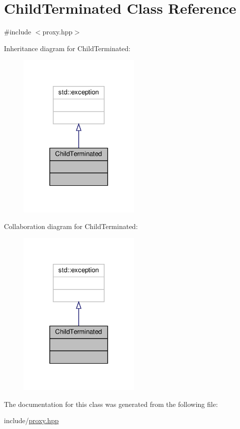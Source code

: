\hypertarget{classChildTerminated}{}\section{Child\+Terminated Class Reference}
\label{classChildTerminated}


{\ttfamily \#include $<$proxy.\+hpp$>$}



Inheritance diagram for Child\+Terminated\+:
\nopagebreak
\begin{figure}[H]
\begin{center}
\leavevmode
\includegraphics[width=168pt]{classChildTerminated__inherit__graph}
\end{center}
\end{figure}


Collaboration diagram for Child\+Terminated\+:
\nopagebreak
\begin{figure}[H]
\begin{center}
\leavevmode
\includegraphics[width=168pt]{classChildTerminated__coll__graph}
\end{center}
\end{figure}


The documentation for this class was generated from the following file\+:\begin{DoxyCompactItemize}
\item 
include/\hyperlink{proxy_8hpp}{proxy.\+hpp}\end{DoxyCompactItemize}

